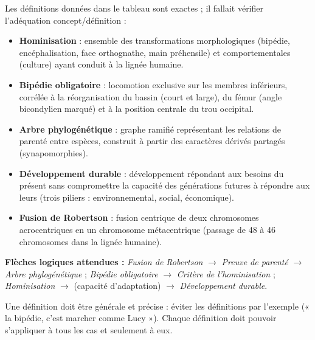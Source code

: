 \documentclass[11pt]{article}
\begin{document}
\begin{corrige}
Les définitions données dans le tableau sont exactes ; il fallait vérifier l'adéquation concept/définition :
\begin{itemize}
    \item \textbf{Hominisation} : ensemble des transformations morphologiques (bipédie, encéphalisation, face orthognathe, main préhensile) et comportementales (culture) ayant conduit à la lignée humaine.
    \item \textbf{Bipédie obligatoire} : locomotion exclusive sur les membres inférieurs, corrélée à la réorganisation du bassin (court et large), du fémur (angle bicondylien marqué) et à la position centrale du trou occipital.
    \item \textbf{Arbre phylogénétique} : graphe ramifié représentant les relations de parenté entre espèces, construit à partir des caractères dérivés partagés (synapomorphies).
    \item \textbf{Développement durable} : développement répondant aux besoins du présent sans compromettre la capacité des générations futures à répondre aux leurs (trois piliers : environnemental, social, économique).
    \item \textbf{Fusion de Robertson} : fusion centrique de deux chromosomes acrocentriques en un chromosome métacentrique (passage de 48 à 46 chromosomes dans la lignée humaine).
\end{itemize}
\textbf{Flèches logiques attendues :}
\emph{Fusion de Robertson} $\rightarrow$ \emph{Preuve de parenté} $\rightarrow$ \emph{Arbre phylogénétique} ; \emph{Bipédie obligatoire} $\rightarrow$ \emph{Critère de l'hominisation} ; \emph{Hominisation} $\rightarrow$ (capacité d'adaptation) $\rightarrow$ \emph{Développement durable}.
\end{corrige}

\begin{attention}
Une définition doit être générale et précise : éviter les définitions par l'exemple (« la bipédie, c'est marcher comme Lucy »). Chaque définition doit pouvoir s'appliquer à tous les cas et seulement à eux.
\end{attention}
\end{document}
